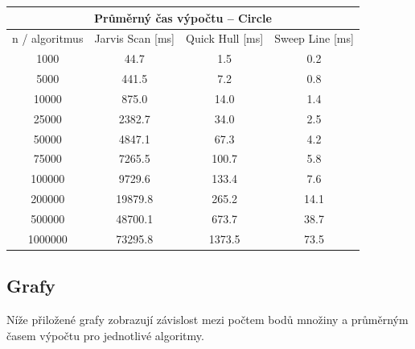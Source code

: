 \documentclass[a4paper, 12pt]{article}
\begin{document}
\begin{table}[]                                                                            
\centering                                                                                 
\begin{tabular}{|c|c|c|c|}                                                                 
\hline                                                                                     
\multicolumn{4}{|c|}{\textbf{Průměrný čas výpočtu – Circle}}                	    \\ \hline
n / algoritmus & Jarvis Scan {[}ms{]} & Quick Hull {[}ms{]} & Sweep Line {[}ms{]} \\ \hline
1000           & 44.7                 & 1.5                 & 0.2                 \\ \hline
5000           & 441.5                & 7.2                 & 0.8                 \\ \hline
10000          & 875.0                & 14.0                & 1.4                 \\ \hline
25000          & 2382.7               & 34.0                & 2.5                 \\ \hline
50000          & 4847.1               & 67.3                & 4.2                 \\ \hline
75000          & 7265.5               & 100.7               & 5.8                 \\ \hline
100000         & 9729.6               & 133.4               & 7.6                 \\ \hline
200000         & 19879.8              & 265.2               & 14.1                \\ \hline
500000         & 48700.1              & 673.7               & 38.7                \\ \hline
1000000        & 73295.8              & 1373.5              & 73.5                \\ \hline
\end{tabular}                                                                              
\end{table}                                                                                

\clearpage

\subsection{Grafy}
Níže přiložené grafy zobrazují závislost mezi počtem bodů množiny a průměrným časem výpočtu pro jednotlivé algoritmy. 
\end{document}
